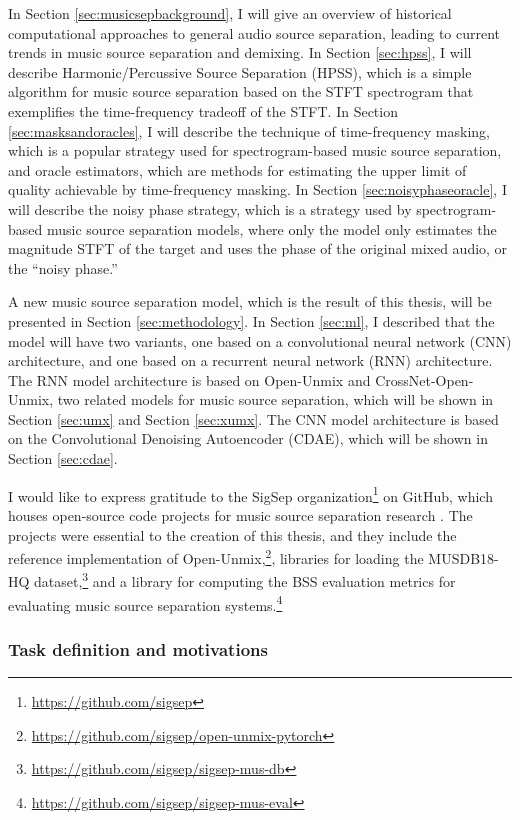 \documentclass[report.tex]{subfiles}
\begin{document}
In Section \ref{sec:musicsepbackground}, I will give an overview of historical computational approaches to general audio source separation, leading to current trends in music source separation and demixing. In Section \ref{sec:hpss}, I will describe Harmonic/Percussive Source Separation (HPSS), which is a simple algorithm for music source separation based on the STFT spectrogram that exemplifies the time-frequency tradeoff of the STFT. In Section \ref{sec:masksandoracles}, I will describe the technique of time-frequency masking, which is a popular strategy used for spectrogram-based music source separation, and oracle estimators, which are methods for estimating the upper limit of quality achievable by time-frequency masking. In Section \ref{sec:noisyphaseoracle}, I will describe the noisy phase strategy, which is a strategy used by spectrogram-based music source separation models, where only the model only estimates the magnitude STFT of the target and uses the phase of the original mixed audio, or the ``noisy phase.''

A new music source separation model, which is the result of this thesis, will be presented in Section \ref{sec:methodology}. In Section \ref{sec:ml}, I described that the model will have two variants, one based on a convolutional neural network (CNN) architecture, and one based on a recurrent neural network (RNN) architecture. The RNN model architecture is based on Open-Unmix and CrossNet-Open-Unmix, two related models for music source separation, which will be shown in Section \ref{sec:umx} and Section \ref{sec:xumx}. The CNN model architecture is based on the Convolutional Denoising Autoencoder (CDAE), which will be shown in Section \ref{sec:cdae}.

I would like to express gratitude to the SigSep organization\footnote{\url{https://github.com/sigsep}} on GitHub, which houses open-source code projects for music source separation research \parencite{umx}. The projects were essential to the creation of this thesis, and they include the reference implementation of Open-Unmix,\footnote{\url{https://github.com/sigsep/open-unmix-pytorch}}, libraries for loading the MUSDB18-HQ dataset,\footnote{\url{https://github.com/sigsep/sigsep-mus-db}} and a library for computing the BSS evaluation metrics for evaluating music source separation systems.\footnote{\url{https://github.com/sigsep/sigsep-mus-eval}}

\subsubsection{Task definition and motivations}
\label{sec:musicsepdefsmotivations}
\end{document}
